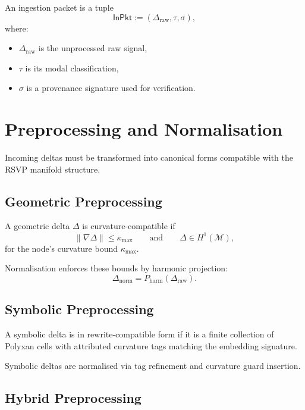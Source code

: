 \begin{definition}
An ingestion packet is a tuple
\[
\mathsf{InPkt}
  := (\Delta_{\mathrm{raw}}, \tau, \sigma),
\]
where:
\begin{itemize}
\item $\Delta_{\mathrm{raw}}$ is the unprocessed raw signal,
\item $\tau$ is its modal classification,
\item $\sigma$ is a provenance signature used for verification.
\end{itemize}
\end{definition}

\section{Preprocessing and Normalisation}

Incoming deltas must be transformed into canonical forms compatible with the 
RSVP manifold structure.

\subsection{Geometric Preprocessing}

\begin{definition}
A geometric delta $\Delta$ is curvature-compatible if
\[
\|\nabla \Delta\| \le \kappa_{\max}
\qquad\text{and}\qquad
\Delta \in H^1(\mathcal{M}),
\]
for the node’s curvature bound $\kappa_{\max}$.
\end{definition}

Normalisation enforces these bounds by harmonic projection:
\[
\Delta_{\mathrm{norm}}
  = P_{\mathrm{harm}}(\Delta_{\mathrm{raw}}).
\]

\subsection{Symbolic Preprocessing}

\begin{definition}
A symbolic delta is in rewrite-compatible form if it is a finite collection of 
Polyxan cells with attributed curvature tags matching the embedding signature.
\end{definition}

Symbolic deltas are normalised via tag refinement and curvature guard insertion.

\subsection{Hybrid Preprocessing}

